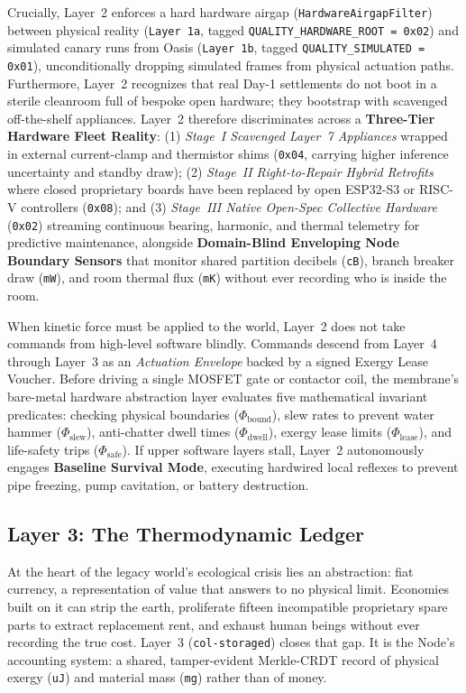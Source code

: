 Crucially, Layer~2 enforces a hard hardware airgap (\texttt{HardwareAirgapFilter}) between physical reality (\texttt{Layer 1a}, tagged \texttt{QUALITY\_HARDWARE\_ROOT = 0x02}) and simulated canary runs from Oasis (\texttt{Layer 1b}, tagged \texttt{QUALITY\_SIMULATED = 0x01}), unconditionally dropping simulated frames from physical actuation paths. Furthermore, Layer~2 recognizes that real Day-1 settlements do not boot in a sterile cleanroom full of bespoke open hardware; they bootstrap with scavenged off-the-shelf appliances. Layer~2 therefore discriminates across a \textbf{Three-Tier Hardware Fleet Reality}: (1) \textit{Stage~I Scavenged Layer~7 Appliances} wrapped in external current-clamp and thermistor shims (\texttt{0x04}, carrying higher inference uncertainty and standby draw); (2) \textit{Stage~II Right-to-Repair Hybrid Retrofits} where closed proprietary boards have been replaced by open ESP32-S3 or RISC-V controllers (\texttt{0x08}); and (3) \textit{Stage~III Native Open-Spec Collective Hardware} (\texttt{0x02}) streaming continuous bearing, harmonic, and thermal telemetry for predictive maintenance, alongside \textbf{Domain-Blind Enveloping Node Boundary Sensors} that monitor shared partition decibels (\texttt{cB}), branch breaker draw (\texttt{mW}), and room thermal flux (\texttt{mK}) without ever recording who is inside the room.

When kinetic force must be applied to the world, Layer~2 does not take commands from high-level software blindly. Commands descend from Layer~4 through Layer~3 as an \textit{Actuation Envelope} backed by a signed Exergy Lease Voucher. Before driving a single MOSFET gate or contactor coil, the membrane's bare-metal hardware abstraction layer evaluates five mathematical invariant predicates: checking physical boundaries ($\Phi_{\mathrm{bound}}$), slew rates to prevent water hammer ($\Phi_{\mathrm{slew}}$), anti-chatter dwell times ($\Phi_{\mathrm{dwell}}$), exergy lease limits ($\Phi_{\mathrm{lease}}$), and life-safety trips ($\Phi_{\mathrm{safe}}$). If upper software layers stall, Layer~2 autonomously engages \textbf{Baseline Survival Mode}, executing hardwired local reflexes to prevent pipe freezing, pump cavitation, or battery destruction.

\subsection{Layer 3: The Thermodynamic Ledger}

At the heart of the legacy world's ecological crisis lies an abstraction: fiat currency, a representation of value that answers to no physical limit. Economies built on it can strip the earth, proliferate fifteen incompatible proprietary spare parts to extract replacement rent, and exhaust human beings without ever recording the true cost. Layer~3 (\texttt{col-storaged}) closes that gap. It is the Node's accounting system: a shared, tamper-evident Merkle-CRDT record of physical exergy (\texttt{uJ}) and material mass (\texttt{mg}) rather than of money.

